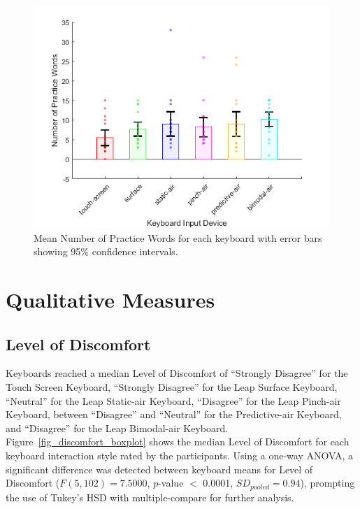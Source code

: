 \begin{figure}[!t]
	\centering
	\includegraphics{Figures/fig_num_practice_mean}
	\caption[Mean Number of Practice Words]{Mean Number of Practice Words for each keyboard with error bars showing 95\% confidence intervals.}
	\label{fig_num_practice_mean}
\end{figure}

\section{Qualitative Measures}
\subsection{Level of Discomfort}
Keyboards reached a median Level of Discomfort of ``Strongly Disagree'' for the Touch Screen Keyboard, ``Strongly Disagree'' for the Leap Surface Keyboard, ``Neutral'' for the Leap Static-air Keyboard, ``Disagree'' for the Leap Pinch-air Keyboard, between ``Disagree'' and ``Neutral'' for the Predictive-air Keyboard, and ``Disagree'' for the Leap Bimodal-air Keyboard. Figure~\ref{fig_discomfort_boxplot} shows the median Level of Discomfort for each keyboard interaction style rated by the participants. Using a one-way ANOVA, a significant difference was detected between keyboard means for Level of Discomfort ($F(5, 102) = 7.5000$, $p$-value $<$ 0.0001, $SD_{pooled} = 0.94$), prompting the use of Tukey's HSD with multiple-compare for further analysis.

